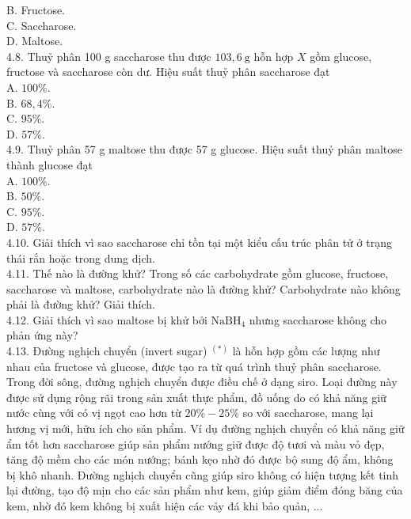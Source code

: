 \documentclass[10pt]{article}
\begin{document}
B. Fructose.\\
C. Saccharose.\\
D. Maltose.\\
4.8. Thuỷ phân 100 g saccharose thu được $103,6 \mathrm{~g}$ hỗn hợp $X$ gồm glucose, fructose và saccharose còn dư. Hiệu suất thuỷ phân saccharose đạt\\
A. $100 \%$.\\
B. $68,4 \%$.\\
C. $95 \%$.\\
D. $57 \%$.\\
4.9. Thuỷ phân 57 g maltose thu được 57 g glucose. Hiệu suất thuỷ phân maltose thành glucose đạt\\
A. $100 \%$.\\
B. $50 \%$.\\
C. $95 \%$.\\
D. $57 \%$.\\
4.10. Giải thích vì sao saccharose chỉ tồn tại một kiểu cấu trúc phân tử ở trạng thái rắn hoặc trong dung dịch.\\
4.11. Thế nào là đường khử? Trong số các carbohydrate gồm glucose, fructose, saccharose và maltose, carbohydrate nào là đường khử? Carbohydrate nào không phải là đường khử? Giải thích.\\
4.12. Giải thích vì sao maltose bị khử bởi $\mathrm{NaBH}_{4}$ nhưng saccharose không cho phản ứng này?\\
4.13. Đường nghịch chuyển (invert sugar) ${ }^{(*)}$ là hỗn hợp gồm các lượng như nhau của fructose và glucose, được tạo ra từ quá trình thuỷ phân saccharose. Trong đời sông, đường nghịch chuyển được điều chế ở dạng siro. Loại đường này được sử dụng rộng rãi trong sản xuất thực phẩm, đồ uống do có khả năng giữ nước cùng với có vị ngọt cao hơn từ $20 \%-25 \%$ so với saccharose, mang lại hương vị mới, hữu ích cho sản phẩm. Ví dụ đường nghịch chuyển có khả năng giữ ẩm tốt hơn saccharose giúp sản phẩm nướng giữ được độ tươi và màu vỏ đẹp, tăng độ mềm cho các món nướng; bánh kẹo nhờ đó được bộ sung độ ẩm, không bị khô nhanh. Đường nghịch chuyển cũng giúp siro không có hiện tượng kết tinh lại đường, tạo độ mịn cho các sản phẩm như kem, giúp giảm điểm đóng băng của kem, nhờ đó kem không bị xuất hiện các vảy đá khi bảo quản, ...
\end{document}
